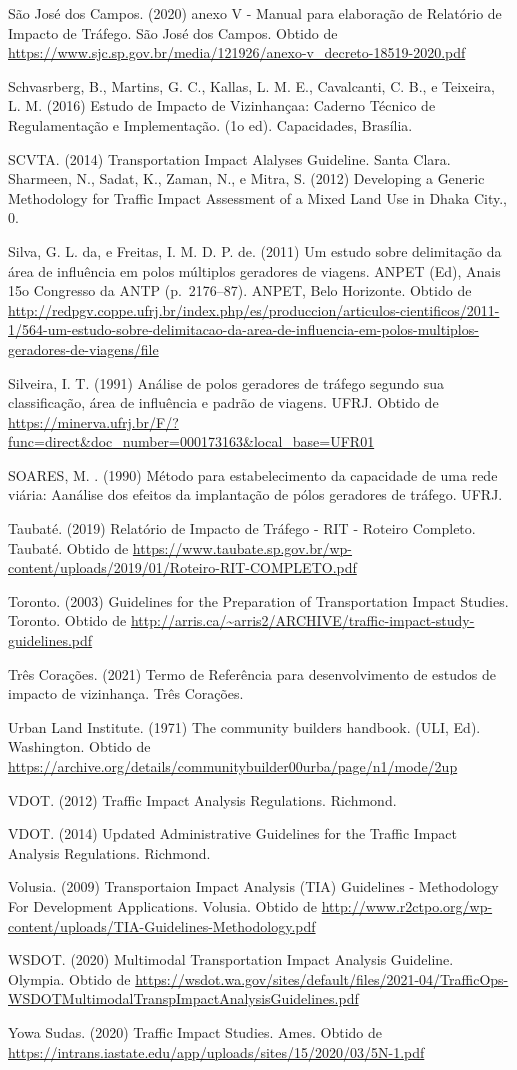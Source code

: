 \documentclass[]{article}
\begin{document}
São José dos Campos. (2020) anexo V - Manual para elaboração de
Relatório de Impacto de Tráfego. São José dos Campos. Obtido de
\url{https://www.sjc.sp.gov.br/media/121926/anexo-v_decreto-18519-2020.pdf}

Schvasrberg, B., Martins, G. C., Kallas, L. M. E., Cavalcanti, C. B., e
Teixeira, L. M. (2016) Estudo de Impacto de Vizinhançaa: Caderno Técnico
de Regulamentação e Implementação. (1o ed). Capacidades, Brasília.

SCVTA. (2014) Transportation Impact Alalyses Guideline. Santa Clara.\\
Sharmeen, N., Sadat, K., Zaman, N., e Mitra, S. (2012) Developing a
Generic Methodology for Traffic Impact Assessment of a Mixed Land Use in
Dhaka City., 0.

Silva, G. L. da, e Freitas, I. M. D. P. de. (2011) Um estudo sobre
delimitação da área de influência em polos múltiplos geradores de
viagens. ANPET (Ed), Anais 15o Congresso da ANTP (p.~2176--87). ANPET,
Belo Horizonte. Obtido de
\url{http://redpgv.coppe.ufrj.br/index.php/es/produccion/articulos-cientificos/2011-1/564-um-estudo-sobre-delimitacao-da-area-de-influencia-em-polos-multiplos-geradores-de-viagens/file}

Silveira, I. T. (1991) Análise de polos geradores de tráfego segundo sua
classificação, área de influência e padrão de viagens. UFRJ. Obtido de
\url{https://minerva.ufrj.br/F/?func=direct\&doc_number=000173163\&local_base=UFR01}

SOARES, M. . (1990) Método para estabelecimento da capacidade de uma
rede viária: Aanálise dos efeitos da implantação de pólos geradores de
tráfego. UFRJ.

Taubaté. (2019) Relatório de Impacto de Tráfego - RIT - Roteiro
Completo. Taubaté. Obtido de
\url{https://www.taubate.sp.gov.br/wp-content/uploads/2019/01/Roteiro-RIT-COMPLETO.pdf}

Toronto. (2003) Guidelines for the Preparation of Transportation Impact
Studies. Toronto. Obtido de
\url{http://arris.ca/~arris2/ARCHIVE/traffic-impact-study-guidelines.pdf}

Três Corações. (2021) Termo de Referência para desenvolvimento de
estudos de impacto de vizinhança. Três Corações.

Urban Land Institute. (1971) The community builders handbook. (ULI, Ed).
Washington. Obtido de
\url{https://archive.org/details/communitybuilder00urba/page/n1/mode/2up}

VDOT. (2012) Traffic Impact Analysis Regulations. Richmond.

VDOT. (2014) Updated Administrative Guidelines for the Traffic Impact
Analysis Regulations. Richmond.

Volusia. (2009) Transportaion Impact Analysis (TIA) Guidelines -
Methodology For Development Applications. Volusia. Obtido de
\url{http://www.r2ctpo.org/wp-content/uploads/TIA-Guidelines-Methodology.pdf}

WSDOT. (2020) Multimodal Transportation Impact Analysis Guideline.
Olympia. Obtido de
\url{https://wsdot.wa.gov/sites/default/files/2021-04/TrafficOps-WSDOTMultimodalTranspImpactAnalysisGuidelines.pdf}

Yowa Sudas. (2020) Traffic Impact Studies. Ames. Obtido de
\url{https://intrans.iastate.edu/app/uploads/sites/15/2020/03/5N-1.pdf}
\end{document}
